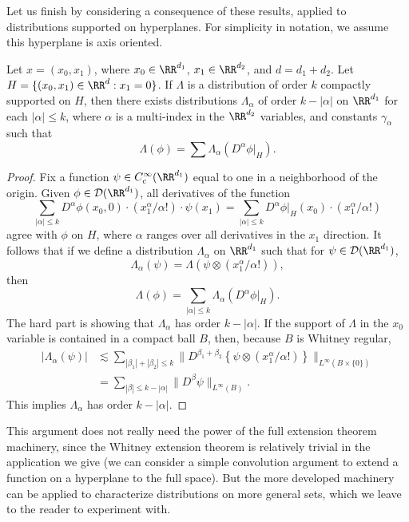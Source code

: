 Let us finish by considering a consequence of these results, applied to distributions supported on hyperplanes. For simplicity in notation, we assume this hyperplane is axis oriented.

\begin{theorem}
    Let $x = (x_0,x_1)$, where $x_0 \in \RR^{d_1}$, $x_1 \in \RR^{d_2}$, and $d = d_1 + d_2$. Let $H = \{ (x_0,x_1) \in \RR^d: x_1 = 0 \}$. If $\Lambda$ is a distribution of order $k$ compactly supported on $H$, then there exists distributions $\Lambda_\alpha$ of order $k - |\alpha|$ on $\RR^{d_1}$ for each $|\alpha| \leq k$, where $\alpha$ is a multi-index in the $\RR^{d_2}$ variables, and constants $\gamma_\alpha$ such that
    \[ \Lambda(\phi) = \sum \Lambda_\alpha(D^\alpha \phi |_H). \]
\end{theorem}
\begin{proof}
    Fix a function $\psi \in C_c^\infty(\RR^{d_1})$ equal to one in a neighborhood of the origin. Given $\phi \in \mathcal{D}(\RR^{d_1})$, all derivatives of the function
    \[ \sum_{|\alpha| \leq k} D^\alpha \phi(x_0,0) \cdot (x_1^\alpha / \alpha!) \cdot \psi(x_1) = \sum_{|\alpha| \leq k} D^\alpha \phi |_H (x_0) \cdot (x_1^\alpha / \alpha!) \]
    agree with $\phi$ on $H$, where $\alpha$ ranges over all derivatives in the $x_1$ direction. It follows that if we define a distribution $\Lambda_\alpha$ on $\RR^{d_1}$ such that for $\psi \in \mathcal{D}(\RR^{d_1})$,
    \[ \Lambda_\alpha(\psi) = \Lambda( \psi \otimes (x_1^\alpha / \alpha!)), \]
    then
    \[ \Lambda(\phi) = \sum_{|\alpha| \leq k} \Lambda_\alpha( D^\alpha \phi |_H ). \]
    The hard part is showing that $\Lambda_\alpha$ has order $k - |\alpha|$. If the support of $\Lambda$ in the $x_0$ variable is contained in a compact ball $B$, then, because $B$ is Whitney regular,
    \begin{align*}
        |\Lambda_\alpha(\psi)| &\lesssim \sum_{|\beta_1| + |\beta_2| \leq k} \| D^{\beta_1 + \beta_2} \left\{ \psi \otimes (x_1^\alpha / \alpha!) \right\} \|_{L^\infty(B \times \{ 0 \})}\\
        &= \sum_{|\beta| \leq k - |\alpha|} \| D^\beta \psi \|_{L^\infty(B)}.
    \end{align*}
    This implies $\Lambda_\alpha$ has order $k-|\alpha|$.
\end{proof}

\begin{remark}
    This argument does not really need the power of the full extension theorem machinery, since the Whitney extension theorem is relatively trivial in the application we give (we can consider a simple convolution argument to extend a function on a hyperplane to the full space). But the more developed machinery can be applied to characterize distributions on more general sets, which we leave to the reader to experiment with.
\end{remark}

